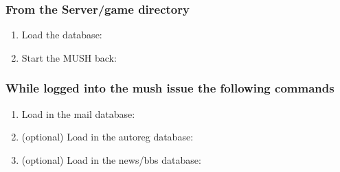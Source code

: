 \documentclass[letterpaper,10pt,english]{sphinxmanual}
\begin{document}
\subsubsection{From the Server/game directory}
\label{\detokenize{legacy:from-the-server-game-directory}}\begin{enumerate}
%
\item {} 
\sphinxAtStartPar
Load the database:

\begin{sphinxVerbatim}[commandchars=\\\{\}]
   
\end{sphinxVerbatim}

\item {} 
\sphinxAtStartPar
Start the MUSH back:

\begin{sphinxVerbatim}[commandchars=\\\{\}]
\end{sphinxVerbatim}

\end{enumerate}


\subsubsection{While logged into the mush issue the following commands}
\label{\detokenize{legacy:while-logged-into-the-mush-issue-the-following-commands}}\begin{enumerate}
%
\item {} 
\sphinxAtStartPar
Load in the mail database:

\begin{sphinxVerbatim}[commandchars=\\\{\}]
\end{sphinxVerbatim}

\item {} 
\sphinxAtStartPar
(optional) Load in the autoreg database:

\begin{sphinxVerbatim}[commandchars=\\\{\}]
\end{sphinxVerbatim}

\item {} 
\sphinxAtStartPar
(optional) Load in the news/bbs database:

\begin{sphinxVerbatim}[commandchars=\\\{\}]
\end{sphinxVerbatim}

\end{enumerate}
\end{document}
